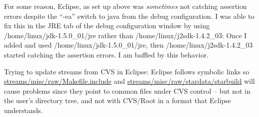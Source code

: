 \documentclass[11pt]{article}
\begin{document}
For some reason, Eclipse, as set up above was {\em sometimes} not catching assertion
errors despite the ``-ea'' switch to java from the debug
configuration.  I was able to fix this in the JRE tab of the debug
configuration window by using /home/linux/jdk-1.5.0\_01/jre rather than
/home/linux/j2sdk-1.4.2\_03: Once I added and used /home/linux/jdk-1.5.0\_01/jre, then 
/home/linux/j2sdk-1.4.2\_03 started catching the assertion errors.  I am baffled by this behavior.

Trying to update streams from CVS in Eclipse:
Eclipse follows symbolic links so \url{streams/misc/raw/Makefile.include} and
\url{streams/misc/raw/stardata/starbuild} will cause problems since they point to common files under 
CVS control -- but not in the user's directory tree, and not with CVS/Root in a format that 
Eclipse understands.
\end{document}
